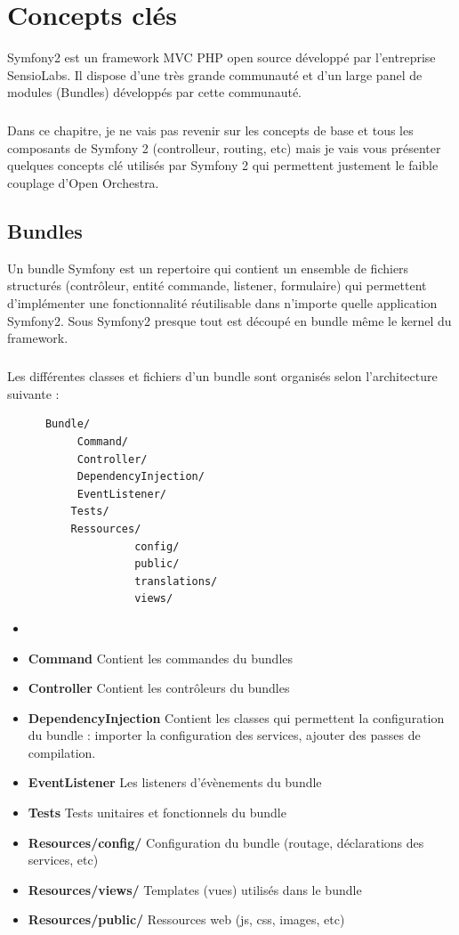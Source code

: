 \chapter{Concepts clés}
Symfony2 est un framework MVC PHP open source développé par l'entreprise SensioLabs. Il dispose d'une très grande communauté et d'un large panel de modules (\og{}Bundles\fg{}) développés par cette communauté.
\paragraph{}
Dans ce chapitre, je ne vais pas revenir sur les concepts de base et tous les composants de Symfony 2 (controlleur, routing, etc) mais je vais vous présenter quelques concepts clé utilisés par Symfony 2 qui permettent justement le faible couplage d'Open Orchestra.
\section{Bundles}
\label{bundle}
Un bundle Symfony est un repertoire qui contient un ensemble de fichiers structurés (contrôleur, entité commande, listener, formulaire) qui permettent d'implémenter une fonctionnalité réutilisable dans n'importe quelle application Symfony2. Sous Symfony2 presque tout est découpé en bundle même le kernel du framework.
\paragraph{}
Les différentes classes et fichiers d'un bundle sont organisés selon l'architecture suivante : 

\begin{verbatim}
      Bundle/
           Command/  
           Controller/
           DependencyInjection/
           EventListener/
          Tests/
          Ressources/
                    config/
                    public/
                    translations/
                    views/
\end{verbatim}
\begin{itemize}
\item[]
\item \textbf{Command} Contient les commandes du bundles
\item \textbf{Controller} Contient les contrôleurs du bundles
\item \textbf{DependencyInjection} Contient les classes qui permettent la configuration du bundle : importer la configuration des services, ajouter des passes de compilation.
\item \textbf{EventListener} Les listeners d'évènements du bundle
\item \textbf{Tests} Tests unitaires et fonctionnels du bundle
\item \textbf{Resources/config/} Configuration du bundle (routage, déclarations des services, etc)
\item \textbf{Resources/views/} Templates (vues) utilisés dans le bundle
\item \textbf{Resources/public/} Ressources web (js, css, images, etc)
\end{itemize}
